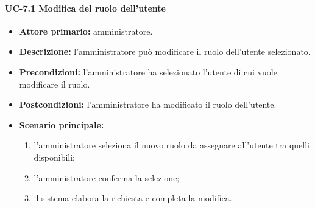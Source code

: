     \paragraph{UC-7.1 Modifica del ruolo dell'utente}
    \begin{itemize}
        \item \textbf{Attore primario:} amministratore.
    
        \item \textbf{Descrizione:} l'amministratore può modificare il ruolo dell'utente selezionato.
        
        \item \textbf{Precondizioni:} l'amministratore ha selezionato l'utente di cui vuole modificare il ruolo.
    
        \item \textbf{Postcondizioni:} l'amministratore ha modificato il ruolo dell'utente.
    
        \item \textbf{Scenario principale:}
        \begin{enumerate}
            \item  l'amministratore seleziona il nuovo ruolo da assegnare all'utente tra quelli disponibili;
            \item l'amministratore conferma la selezione;
            \item il sistema elabora la richiesta e completa la modifica.
        \end{enumerate}
    \end{itemize}
    
